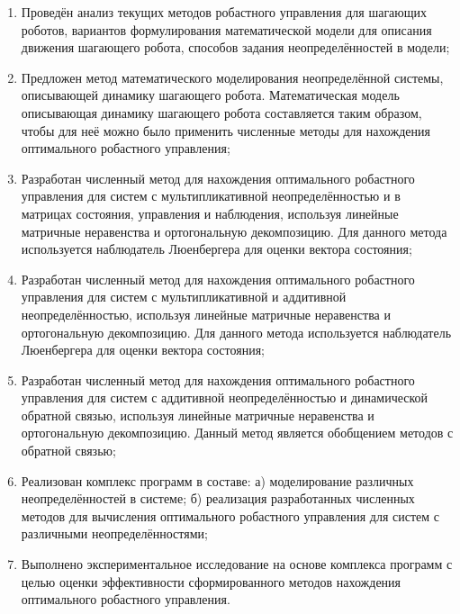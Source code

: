 \begin{enumerate}
  \item Проведён анализ текущих методов робастного управления для шагающих роботов, вариантов формулирования математической модели для описания движения шагающего робота, способов задания неопределённостей в модели;
  \item Предложен метод математического моделирования неопределённой системы, описывающей динамику шагающего робота. Математическая модель описывающая динамику шагающего робота составляется таким образом, чтобы для неё можно было применить численные методы для нахождения оптимального робастного управления;
  \item Разработан численный метод для нахождения оптимального робастного управления для систем с мультипликативной неопределённостью и в матрицах состояния, управления и наблюдения, используя линейные матричные неравенства и ортогональную декомпозицию. Для данного метода используется наблюдатель Люенбергера для оценки вектора состояния;
  \item Разработан численный метод для нахождения оптимального робастного управления для систем с мультипликативной и аддитивной неопределённостью, используя линейные матричные неравенства и ортогональную декомпозицию. Для данного метода используется наблюдатель Люенбергера для оценки вектора состояния;
  \item Разработан численный метод для нахождения оптимального робастного управления для систем с аддитивной неопределённостью и динамической обратной связью, используя линейные матричные неравенства и ортогональную декомпозицию. Данный метод является обобщением методов с обратной связью;
  \item Реализован комплекс программ в составе: а) моделирование различных неопределённостей в системе; б) реализация разработанных численных методов для вычисления оптимального робастного управления для систем с различными неопределённостями;
  \item Выполнено экспериментальное исследование на основе комплекса программ с целью оценки эффективности сформированного методов нахождения оптимального робастного управления.
\end{enumerate}
